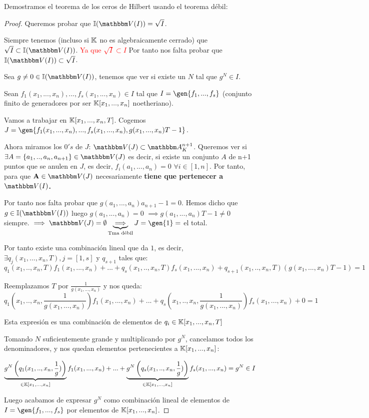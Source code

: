 Demostramos el teorema de los ceros de Hilbert usando el teorema débil:
\begin{proof}
	Queremos probar que $\I(\V(I))=\sqrt{I}$.

	Siempre tenemos (incluso si $\mathbb{K}$ no es algebraicamente cerrado) que $\sqrt{I} \subset \I(\V(I))$. \textcolor{red}{Ya que $\sqrt{I} \subset I$} Por tanto nos falta probar que $\I(\V(I)) \subset \sqrt{I}$.

	Sea $g \neq 0 \in \I(\V(I))$, tenemos que ver si existe un $N$ tal que $g^N \in I$.

	Sean $f_1(x_1,...,x_n),...,f_s(x_1,...,x_n) \in I$ tal que $I=\gen{f_1,...,f_s}$ (conjunto finito de generadores por ser $\mathbb{K}[x_1,...,x_n]$ noetheriano).

	Vamos a trabajar en $\mathbb{K}[x_1,...,x_n,T]$. Cogemos $J=\gen{f_1(x_1,...,x_n),...,f_s(x_1,...,x_n), g(x_1,...,x_n)T-1}$.

	Ahora miramos los $0's$ de $J$: $\V(J) \subset \A^{n+1}_K$. Queremos ver si $\exists A=\{a_1,..,a_n,a_{n+1} \} \in \V(J)$ es decir, si existe un conjunto $A$ de n+1 puntos que se anulen en $J$, es decir, $f_i(a_1,...,a_n)=0$ $\forall i \in [1,n]$. Por tanto, para que $\textbf{A} \in \V(J)$ necesariamente \textbf{tiene que pertenecer a $\V(I)$.}

	Por tanto nos falta probar que $g(a_1,...,a_n)a_{n+1}-1=0$. Hemos dicho que $g \in \I(\V(I))$ luego $g(a_1,...,a_n)=0$ $\implies g(a_1,...,a_n)T-1\neq 0$ siempre. $\implies \V(J)=\emptyset \underbrace{\implies}_{\text{Tma débil}} J=\gen{1}=$ el total.

	Por tanto existe una combinación lineal que da $1$, es decir,  $\exists q_j(x_1,...,x_n,T), j=[1,s]$ y $q_{s+1}$ tales que:
	$$ q_1(x_1,..,x_n,T)f_1(x_1,...,x_n)+...+q_s(x_1,..,x_n,T)f_s(x_1,...,x_n) + q_{s+1}(x_1,..,x_n,T)(g(x_1,...,x_n)T-1)=1 $$

	Reemplazamos $T$ por $\frac{1}{g(x_1,...,x_n)}$ y nos queda:
	$$ q_1(x_1,..,x_n, \frac{1}{g(x_1,...,x_n)})f_1(x_1,...,x_n)+...+q_s(x_1,..,x_n,\frac{1}{g(x_1,...,x_n)})f_s(x_1,...,x_n)+0=1 $$

	Esta expresión es una combinación de elementos de $q_i \in \mathbb{K}[x_1,...,x_n,T]$

	Tomando $N$ suficientemente grande y multiplicando por $g^N$, cancelamos todos los denominadores, y nos quedan elementos pertenecientes a $\mathbb{K}[x_1,...,x_n]$:

	$$ \underbrace{g^N\left(q_1(x_1,..,x_n, \frac{1}{g})\right)}_{\in \mathbb{K}[x_1,...,x_n]}f_1(x_1,...,x_n)+...+ \underbrace{g^N \left( q_s(x_1,..,x_n,\frac{1}{g})\right)}_{\in \mathbb{K}[x_1,...,x_n]}f_s(x_1,...,x_n) =g^N \in I $$

	Luego acabamos de expresar $g^N$ como combinación lineal de elementos de $I=\gen{f_1,...,f_s}$ por elementos de $\mathbb{K}[x_1,...,x_n]$.
\end{proof}



